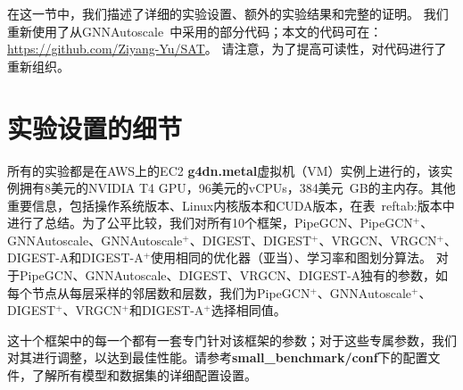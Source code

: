 在这一节中，我们描述了详细的实验设置、额外的实验结果和完整的证明。
我们重新使用了从GNNAutoscale~\cite{fey2021gnnautoscale}中采用的部分代码；本文的代码可在： \url{https://github.com/Ziyang-Yu/SAT}。
请注意，为了提高可读性，对代码进行了重新组织。 

\section*{实验设置的细节}


所有的实验都是在AWS上的EC2 {\textbf{g4dn.metal}}虚拟机（VM）实例上进行的，该实例拥有8美元的NVIDIA T4 GPU，96美元的vCPUs，384美元~GB的主内存。其他重要信息，包括操作系统版本、Linux内核版本和CUDA版本，在表~ref{tab:版本}中进行了总结。为了公平比较，我们对所有10个框架，PipeGCN、PipeGCN$^{+}$、GNNAutoscale、GNNAutoscale$^{+}$、DIGEST、DIGEST$^{+}$、VRGCN、VRGCN$^{+}$、DIGEST-A和DIGEST-A$^{+}$使用相同的优化器（亚当）、学习率和图划分算法。
对于PipeGCN、GNNAutoscale、DIGEST、VRGCN、DIGEST-A独有的参数，如每个节点从每层采样的邻居数和层数，我们为PipeGCN$^{+}$、GNNAutoscale$^{+}$、DIGEST$^{+}$、VRGCN$^{+}$和DIGEST-A$^{+}$选择相同值。

这十个框架中的每一个都有一套专门针对该框架的参数；对于这些专属参数，我们对其进行调整，以达到最佳性能。请参考\textbf{small\_benchmark/conf}下的配置文件，了解所有模型和数据集的详细配置设置。



